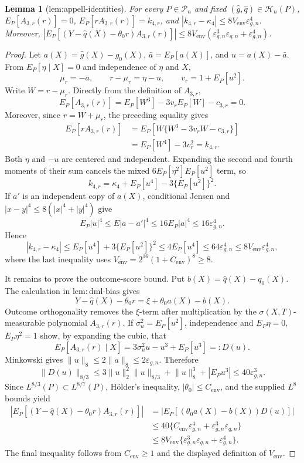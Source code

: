 \documentclass{article}
\newtheorem{lemma}{Lemma}
\begin{document}
\begin{lemma}[lem:appell-identities]\label{lem:appell-identities}
For every \(P\in\mathcal P_n\) and fixed \((\widehat g,\widehat q)\in\mathcal H_n(P)\), \(E_P[A_{3,r}(r)]=0\), \(E_P[rA_{3,r}(r)]=k_{4,r}\), and \(|k_{4,r}-\kappa_4|\le8V_{\mathrm{env}}\varepsilon_{g,n}^4\). Moreover, \(|E_P[(Y-\widehat q(X)-\theta_0r)A_{3,r}(r)]|\le8V_{\mathrm{env}}(\varepsilon_{g,n}^3\varepsilon_{q,n}+\varepsilon_{g,n}^4)\).
\end{lemma}
\begin{proof}
Let \(a(X)=\widehat g(X)-g_0(X)\), \(\bar a=E_P[a(X)]\), and \(u=a(X)-\bar a\).  From \(E_P[\eta\mid X]=0\) and independence of \(\eta\) and \(X\),
\[
\mu_r=-\bar a,
\qquad r-\mu_r=\eta-u,
\qquad v_r=1+E_P[u^2].
\]
Write \(W=r-\mu_r\).  Directly from the definition of \(A_{3,r}\),
\[
E_P[A_{3,r}(r)]
=E_P[W^3]-3v_rE_P[W]-c_{3,r}=0.
\]
Moreover, since \(r=W+\mu_r\), the preceding equality gives
\[
\begin{aligned}
E_P[rA_{3,r}(r)]
&=E_P[W\{W^3-3v_rW-c_{3,r}\}]\\
&=E_P[W^4]-3v_r^2=k_{4,r}.
\end{aligned}
\]
Both \(\eta\) and \(-u\) are centered and independent.  Expanding the second and fourth moments of their sum cancels the mixed \(6E_P[\eta^2]E_P[u^2]\) term, so
\[
k_{4,r}=\kappa_4+E_P[u^4]-3\{E_P[u^2]\}^2.
\]
If \(a'\) is an independent copy of \(a(X)\), conditional Jensen and \(|x-y|^4\le8(|x|^4+|y|^4)\) give
\[
E_P|u|^4\le E|a-a'|^4\le16E_P|a|^4\le16\varepsilon_{g,n}^4.
\]
Hence
\[
|k_{4,r}-\kappa_4|
\le E_P[u^4]+3\{E_P[u^2]\}^2
\le4E_P[u^4]
\le64\varepsilon_{g,n}^4
\le8V_{\mathrm{env}}\varepsilon_{g,n}^4,
\]
where the last inequality uses \(V_{\mathrm{env}}=2^{16}(1+C_{\mathrm{env}})^8\ge8\).

It remains to prove the outcome-score bound.  Put \(b(X)=\widehat q(X)-q_0(X)\).  The calculation in \(\mathrm{lem:dml\mbox{-}bias}\) gives
\[
Y-\widehat q(X)-\theta_0r=\xi+\theta_0a(X)-b(X).
\]
Outcome orthogonality removes the \(\xi\)-term after multiplication by the \(\sigma(X,T)\)-measurable polynomial \(A_{3,r}(r)\).  If \(\sigma_u^2=E_P[u^2]\), independence and \(E_P\eta=0\), \(E_P\eta^2=1\) show, by expanding the cubic, that
\[
E_P[A_{3,r}(r)\mid X]
=3\sigma_u^2u-u^3+E_P[u^3]=:D(u).
\]
Minkowski gives \(\lVert u\rVert_8\le2\lVert a\rVert_8\le2\varepsilon_{g,n}\).  Therefore
\[
\lVert D(u)\rVert_{8/3}
\le3\lVert u\rVert_2^2\lVert u\rVert_{8/3}
 +\lVert u\rVert_8^3+|E_Pu^3|
\le40\varepsilon_{g,n}^3.
\]
Since \(L^{8/3}(P)\subset L^{8/7}(P)\), H\"older's inequality, \(|\theta_0|\le C_{\mathrm{env}}\), and the supplied \(L^8\) bounds yield
\[
\begin{aligned}
\left|E_P[(Y-\widehat q(X)-\theta_0r)A_{3,r}(r)]\right|
&=\left|E_P[(\theta_0a(X)-b(X))D(u)]\right|\\
&\le40\{C_{\mathrm{env}}\varepsilon_{g,n}^4
 +\varepsilon_{g,n}^3\varepsilon_{q,n}\}\\
&\le8V_{\mathrm{env}}\{\varepsilon_{g,n}^3\varepsilon_{q,n}
 +\varepsilon_{g,n}^4\}.
\end{aligned}
\]
The final inequality follows from \(C_{\mathrm{env}}\ge1\) and the displayed definition of \(V_{\mathrm{env}}\).
\end{proof}
\end{document}
